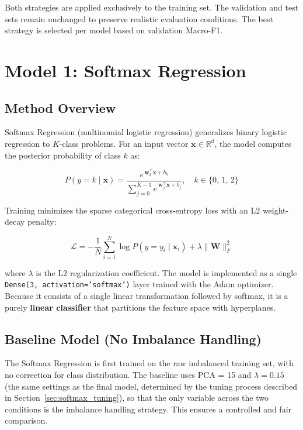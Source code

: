 \documentclass[12pt,a4paper]{article}
\begin{document}
Both strategies are applied exclusively to the training set. The validation and test sets remain unchanged to preserve realistic evaluation conditions. The best strategy is selected per model based on validation Macro-F1.

\section{Model 1: Softmax Regression}

\subsection{Method Overview}

Softmax Regression (multinomial logistic regression) generalizes binary logistic regression to $K$-class problems. For an input vector $\mathbf{x} \in \mathbb{R}^d$, the model computes the posterior probability of class $k$ as:

\begin{equation}
    P(y = k \mid \mathbf{x}) = \frac{e^{\,\mathbf{w}_k^{\top}\mathbf{x} + b_k}}
    {\displaystyle\sum_{j=0}^{K-1} e^{\,\mathbf{w}_j^{\top}\mathbf{x} + b_j}},
    \quad k \in \{0,\, 1,\, 2\}
\end{equation}

Training minimizes the sparse categorical cross-entropy loss with an L2 weight-decay penalty:

\begin{equation}
    \mathcal{L} = -\frac{1}{N}\sum_{i=1}^{N}\log P(y = y_i \mid \mathbf{x}_i)
    + \lambda \lVert\mathbf{W}\rVert_F^2
\end{equation}

where $\lambda$ is the L2 regularization coefficient. The model is implemented as a single \texttt{Dense(3, activation='softmax')} layer trained with the Adam optimizer. Because it consists of a single linear transformation followed by softmax, it is a purely \textbf{linear classifier} that partitions the feature space with hyperplanes.

\subsection{Baseline Model (No Imbalance Handling)}

The Softmax Regression is first trained on the raw imbalanced training set, with no correction for class distribution. The baseline uses PCA = 15 and $\lambda = 0.15$ (the same settings as the final model, determined by the tuning process described in Section~\ref{sec:softmax_tuning}), so that the only variable across the two conditions is the imbalance handling strategy. This ensures a controlled and fair comparison.
\end{document}
